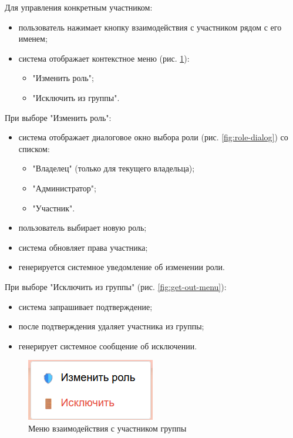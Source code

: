 Для управления конкретным участником:
\begin{itemize}
	\item пользователь нажимает кнопку взаимодействия с участником рядом с его именем;
	\item система отображает контекстное меню (рис. \ref{fig:member-menu}):
	\begin{itemize}
		\item "Изменить роль";
		\item "Исключить из группы".
	\end{itemize}
\end{itemize}

При выборе "Изменить роль":
\begin{itemize}
	\item система отображает диалоговое окно выбора роли (рис. \ref{fig:role-dialog}) со списком:
	\begin{itemize}
		\item "Владелец" (только для текущего владельца);
		\item "Администратор";
		\item "Участник".
	\end{itemize}
	\item пользователь выбирает новую роль;
	\item система обновляет права участника;
	\item генерируется системное уведомление об изменении роли.
\end{itemize}

При выборе "Исключить из группы" (рис. \ref{fig:get-out-menu}):
\begin{itemize}
	\item система запрашивает подтверждение;
	\item после подтверждения удаляет участника из группы;
	\item генерирует системное сообщение об исключении.
\end{itemize}

\begin{figure}[H]
	\centering
	\includegraphics[width=0.7\linewidth]{"images/Меню взаимодействия с участником"}
	\caption{Меню взаимодействия с участником группы}
	\label{fig:member-menu}
\end{figure}


